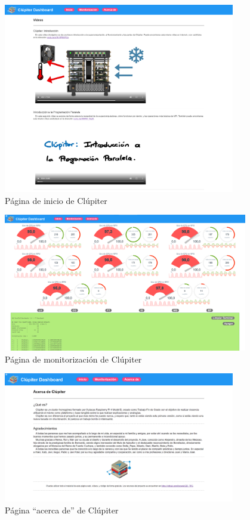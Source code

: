\begin{figure}[h!]
  \centering
  \includegraphics[width=0.9\textwidth]{img/dashboard/inicio.png}
  \caption{Página de inicio de Clúpiter}
  \label{fig:inicio_clupiter}
\end{figure}

\begin{figure}[h!]
  \centering
  \includegraphics[width=0.95\textwidth]{img/dashboard/monitoring.png}
  \caption{Página de monitorización de Clúpiter}
  \label{fig:pagina_monitorizacion}
\end{figure}

\begin{figure}[h!]
  \centering
  \includegraphics[width=0.9\textwidth]{img/dashboard/agradecimientos.png}
  \caption{Página ``acerca de'' de Clúpiter}
  \label{fig:acercade_clupiter}
\end{figure}
\FloatBarrier
